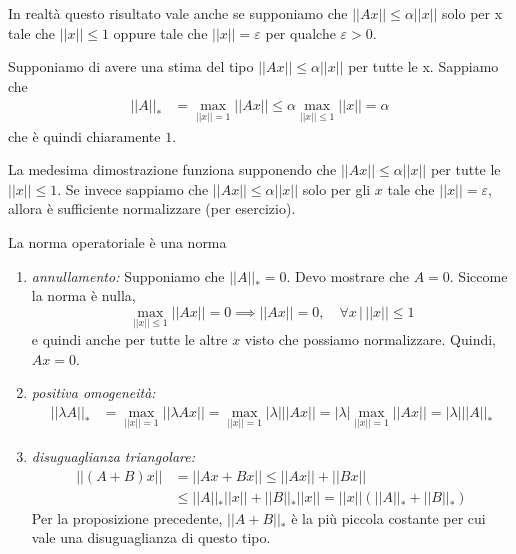 \documentclass[a4paper]{article}
\begin{document}
In realtà questo risultato vale anche se supponiamo che \(||Ax|| \leq \alpha ||x||\)
solo per x tale che \(||x|| \leq 1\) oppure tale che \(||x|| = \varepsilon\)
per qualche \(\varepsilon > 0\).

\begin{snippetproof}{}
    Supponiamo di avere una stima del tipo \(||Ax|| \leq \alpha ||x||\) per tutte le x.
    Sappiamo che
    \begin{align*}
        ||A||_* &= \max_{||x|| = 1} ||Ax|| \leq \alpha \max_{||x|| \leq 1} ||x|| = \alpha
    \end{align*}
    che è quindi chiaramente \(1\).
\end{snippetproof}

La medesima dimostrazione funziona supponendo che \(||Ax|| \leq \alpha ||x||\)
per tutte le \(||x|| \leq 1\).
Se invece sappiamo che \(||Ax|| \leq \alpha ||x||\) solo per gli \(x\)
tale che \(||x|| = \varepsilon\), allora è sufficiente normalizzare (per esercizio).

\begin{snippetproof}{La norma operatoriale è una norma}
    \begin{enumerate}
        \item \emph{annullamento:} Supponiamo che \(||A||_* = 0\).
        Devo mostrare che \(A=0\). Siccome la norma è nulla,
        \[
            \max_{||x|| \leq 1} ||Ax|| = 0 \implies ||Ax|| = 0, \quad \forall x \,|\, ||x|| \leq 1
        \]
        e quindi anche per tutte le altre \(x\) visto che possiamo normalizzare. Quindi, \(Ax = 0\).
        \item \emph{positiva omogeneità:} 
        \begin{align*}
            ||\lambda A||_* &= \max_{||x|| = 1} ||\lambda Ax||
            = \max_{||x|| = 1} |\lambda| ||Ax|| = |\lambda| \max_{||x|| = 1} ||Ax|| = |\lambda| ||A||_*
        \end{align*}
        \item \emph{disuguaglianza triangolare:}
        \begin{align*}
            ||(A+B)x|| &= ||Ax + Bx|| \leq ||Ax|| + ||Bx|| \\
            &\leq ||A||_* ||x|| + ||B||_* ||x|| = ||x|| \left(
                ||A||_* + ||B||_*
            \right)
        \end{align*}
        Per la proposizione precedente, \(||A+B||_*\) è la più piccola costante
        per cui vale una disuguaglianza di questo tipo.
    \end{enumerate}
\end{snippetproof}
\end{document}
